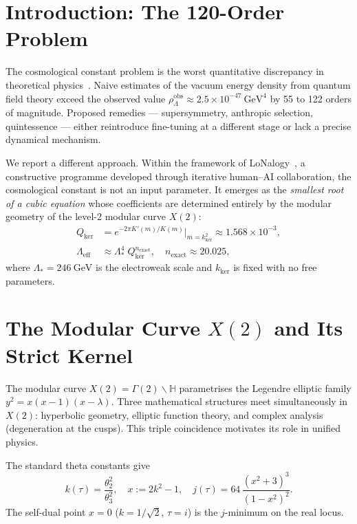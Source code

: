 \documentclass[12pt]{article}
\begin{document}
\setcounter{page}{1}

\section{Introduction: The 120-Order Problem}

The cosmological constant problem is the worst quantitative
discrepancy in theoretical physics~\cite{Weinberg1989,Martin2012}.
Naive estimates of the vacuum energy density from quantum field theory
exceed the observed value
$\rho_\Lambda^{\mathrm{obs}}\approx 2.5\times 10^{-47}~\mathrm{GeV}^4$
by 55 to 122 orders of magnitude.
Proposed remedies --- supersymmetry, anthropic selection,
quintessence --- either reintroduce fine-tuning at a different stage
or lack a precise dynamical mechanism.

We report a different approach.
Within the framework of LoNalogy~\cite{LoNalogy},
a constructive programme developed through iterative human--AI
collaboration, the cosmological constant is not an input parameter.
It emerges as the \emph{smallest root of a cubic equation} whose
coefficients are determined entirely by the modular geometry
of the level-2 modular curve $X(2)$:
\begin{align}
Q_{\mathrm{ker}} &= e^{-2\pi K'(m)/K(m)}\big|_{m=k_{\mathrm{ker}}^2}
\approx 1.568\times 10^{-3},
\label{eq:Qker}\\
\Lambda_{\mathrm{eff}} &\approx \Lambda_*^4\;Q_{\mathrm{ker}}^{n_{\mathrm{exact}}},
\quad n_{\mathrm{exact}}\approx 20.025,
\label{eq:Leff}
\end{align}
where $\Lambda_*=246~\mathrm{GeV}$ is the electroweak scale
and $k_{\mathrm{ker}}$ is fixed with no free parameters.

\section{The Modular Curve $X(2)$ and Its Strict Kernel}

The modular curve $X(2)=\Gamma(2)\backslash\mathbb{H}$ parametrises
the Legendre elliptic family $y^2=x(x-1)(x-\lambda)$.
Three mathematical structures meet simultaneously in $X(2)$:
hyperbolic geometry, elliptic function theory,
and complex analysis (degeneration at the cusps).
This triple coincidence motivates its role in unified physics.

The standard theta constants give
\begin{equation}
k(\tau)=\frac{\theta_2^2}{\theta_3^2},\quad
x:=2k^2-1,\quad
j(\tau)=64\,\frac{(x^2+3)^3}{(1-x^2)^2}.
\end{equation}
The self-dual point $x=0$ ($k=1/\sqrt{2}$, $\tau=i$) is the
$j$-minimum on the real locus.
\end{document}

